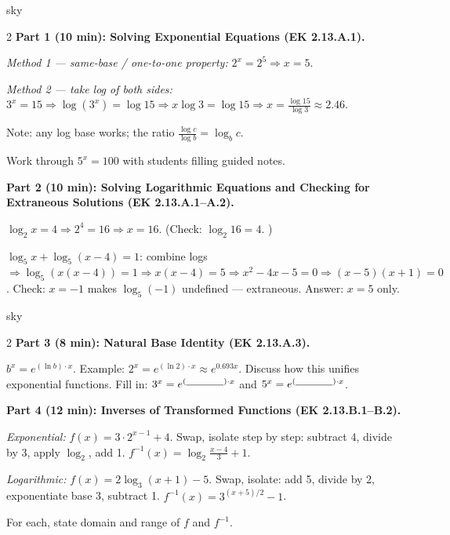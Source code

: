 \documentclass[10pt]{article}
\begin{document}
\begin{skillbox}[Lesson]{sky}
\begin{multicols}{2}
\textbf{Part 1 (10 min): Solving Exponential Equations (EK 2.13.A.1).}

\textit{Method 1 --- same-base / one-to-one property:} $2^x = 2^5 \Rightarrow x = 5$.

\textit{Method 2 --- take log of both sides:} $3^x = 15 \Rightarrow \log(3^x) = \log 15
\Rightarrow x\log 3 = \log 15 \Rightarrow x = \tfrac{\log 15}{\log 3} \approx 2.46$.

Note: any log base works; the ratio $\tfrac{\log c}{\log b} = \log_b c$.

Work through $5^x = 100$ with students filling guided notes.

\columnbreak

\textbf{Part 2 (10 min): Solving Logarithmic Equations and Checking for Extraneous
Solutions (EK 2.13.A.1--A.2).}

$\log_2 x = 4 \Rightarrow 2^4 = 16 \Rightarrow x = 16$. (Check: $\log_2 16 = 4$. \checkmark)

$\log_5 x + \log_5(x-4) = 1$: combine logs $\Rightarrow \log_5(x(x-4))=1 \Rightarrow
x(x-4)=5 \Rightarrow x^2-4x-5=0 \Rightarrow (x-5)(x+1)=0$.
Check: $x=-1$ makes $\log_5(-1)$ undefined --- extraneous. Answer: $x=5$ only.
\end{multicols}
\end{skillbox}

\begin{skillbox}{sky}
\begin{multicols}{2}
\textbf{Part 3 (8 min): Natural Base Identity (EK 2.13.A.3).}

$b^x = e^{(\ln b)\cdot x}$. Example: $2^x = e^{(\ln 2)\cdot x} \approx e^{0.693x}$.
Discuss how this unifies exponential functions. Fill in: $3^x = e^{(\blank{1.2cm})\cdot x}$
and $5^x = e^{(\blank{1.2cm})\cdot x}$.

\columnbreak

\textbf{Part 4 (12 min): Inverses of Transformed Functions (EK 2.13.B.1--B.2).}

\textit{Exponential:} $f(x)=3\cdot2^{x-1}+4$. Swap, isolate step by step: subtract 4,
divide by 3, apply $\log_2$, add 1. $f^{-1}(x)=\log_2\!\tfrac{x-4}{3}+1$.

\textit{Logarithmic:} $f(x)=2\log_3(x+1)-5$. Swap, isolate: add 5, divide by 2,
exponentiate base 3, subtract 1. $f^{-1}(x)=3^{(x+5)/2}-1$.

For each, state domain and range of $f$ and $f^{-1}$.
\end{multicols}
\end{skillbox}
\end{document}
